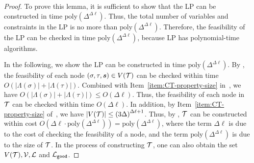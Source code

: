 \documentclass[11pt]{article}
\newcommand{\abs}[1]{\left\vert#1\right\vert}
\def\!#1{\mathtt{#1}}
\def\good{\!{good}}
\def\poly{\mathrm{poly}}
\newcommand{\BuildTime}{\poly\left(\Delta^{\Delta\ell}\right)}
\newcommand{\seqS}{\boldsymbol{s}}
\begin{document}
\BuildingCost*
\begin{proof}
    To prove this lemma, it is sufficient to show that the LP can be constructed in time $\poly\left(\Delta^{\Delta \ell}\right)$. 
    Thus, the total number of variables and constraints in the LP is no more than $\poly\left(\Delta^{\Delta \ell}\right)$.
    Therefore, the feasibility of the LP can be checked in time $\poly\left(\Delta^{\Delta \ell}\right)$, because LP has polynomial-time algorithms.

    In the following, we show the LP can be constructed in time $\poly\left(\Delta^{\Delta \ell}\right)$. 
    By ,
    the feasibility of each node $(\sigma,\tau,\seqS)\in V(\+T)$ can be checked within time $O(\abs{\Lambda(\sigma)}+\abs{\Lambda(\tau)})$.
    Combined with Item~\eqref{item:CT-property-size} in~, we have 
    $O(\abs{\Lambda(\sigma)}+\abs{\Lambda(\tau)})\leq O(\Delta\ell)$.
    Thus, the feasibility of each node in $\mathcal{T}$ can be checked within time $O(\Delta\ell)$.
    In addition, by Item~\eqref{item:CT-property-size} of~, 
    we have $\abs{V(\+T)}\leq \left(3\Delta\right)^{\Delta \ell + 1}$.
    Thus, by , $\mathcal{T}$ can be constructed within cost $O\left(\Delta \ell \cdot \BuildTime\right) = \BuildTime$,
    where the term $\Delta \ell$ is due to the cost of checking the feasibility of a node, and the term
    $\BuildTime$ is due to the size of $\mathcal{T}$.
    In the process of constructing $\mathcal{T}$,
    one can also obtain the set $V(\mathcal{T}),\mathcal{V},\mathcal{L}$ and $\+L_{\good}$.
    


\end{proof}
\end{document}
